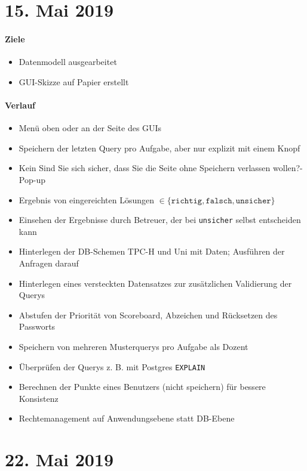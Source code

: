 \section*{15. Mai 2019}
\paragraph{Ziele}
\begin{itemize}
  \item[\check] Datenmodell ausgearbeitet
  \item[\check] GUI-Skizze auf Papier erstellt
\end{itemize}
\paragraph{Verlauf}
\begin{itemize}
  \item Menü oben oder an der Seite des GUIs
  \item Speichern der letzten Query pro Aufgabe, aber nur explizit mit einem Knopf
  \item Kein \glqq{}Sind Sie sich sicher, dass Sie die Seite ohne Speichern verlassen wollen?\grqq{}-Pop-up
  \item Ergebnis von eingereichten Lösungen $\in \{\texttt{richtig}, \texttt{falsch}, \texttt{unsicher}\}$
  \item Einsehen der Ergebnisse durch Betreuer, der bei \texttt{unsicher} selbst entscheiden kann
  \item Hinterlegen der DB-Schemen TPC-H und Uni mit Daten; Ausführen der Anfragen darauf
  \item Hinterlegen eines \glqq{}versteckten\grqq{} Datensatzes zur zusätzlichen Validierung der Querys
  \item Abstufen der Priorität von Scoreboard, Abzeichen und Rücksetzen des Passworts
  \item Speichern von mehreren Musterquerys pro Aufgabe als Dozent
  \item Überprüfen der Querys z. B. mit Postgres \texttt{EXPLAIN}
  \item Berechnen der Punkte eines Benutzers (nicht speichern) für bessere Konsistenz
  \item Rechtemanagement auf Anwendungsebene statt DB-Ebene
\end{itemize}

\section*{22. Mai 2019}
